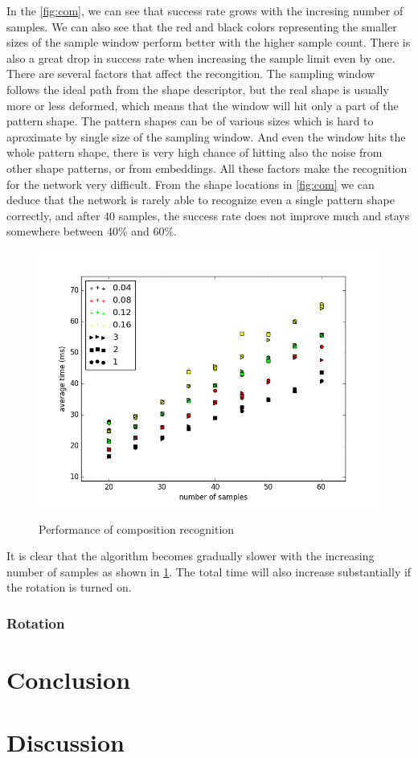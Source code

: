 In the \ref{fig:com}, we can see that success rate grows with the incresing number of samples. We can also see that the red and black colors representing the smaller sizes of the sample window perform better with the higher sample count. There is also a great drop in success rate when increasing the sample limit even by one. There are several factors that affect the recongition. The sampling window follows the ideal path from the shape descriptor, but the real shape is usually more or less deformed, which means that the window will hit only a part of the pattern shape. The pattern shapes can be of various sizes which is hard to aproximate by single size of the sampling window. And even the window hits the whole pattern shape, there is very high chance of hitting also the noise from other shape patterns, or from embeddings. All these factors make the recognition for the network very difficult. From the shape locations in \ref{fig:com} we can deduce that the network is rarely able to recognize even a single pattern shape correctly, and after 40 samples, the success rate does not improve much and stays somewhere between 40\% and 60\%.

\begin{figure}[!htb]
\begin{center}
\label{fig:com_speed}
\includegraphics[width=\linewidth]{ext/figure_composition_speed.png}
\end{center}
	\centering
	\caption{Performance of composition recognition}
\end{figure}
It is clear that the algorithm becomes gradually slower with the increasing number of samples as shown in \ref{fig:com_speed}. The total time will also increase substantially if the rotation is turned on.

\subsubsection{Rotation}






\section{Conclusion}

\section{Discussion}

